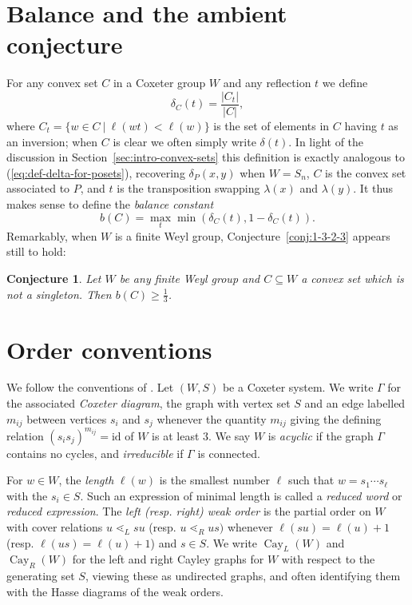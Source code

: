 \documentclass{amsart}
\DeclareMathOperator{\cay}{Cay}
\newcommand{\id}{\mathrm{id}}
\newtheorem{conj}[theorem]{Conjecture}
\theoremstyle{definition}
\theoremstyle{remark}
\begin{document}
\section*{Balance and the ambient conjecture}
For any convex set $C$ in a Coxeter group $W$ and any reflection $t$ we define
\[
\delta_C(t)=\frac{|C_t|}{|C|},
\]
where $C_t=\{w \in C \: | \: \ell(wt)<\ell(w)\}$ is the set of elements in $C$ having $t$ as an inversion; when $C$ is clear we often simply write $\delta(t)$.  In light of the discussion in Section~\ref{sec:intro-convex-sets} this definition is exactly analogous to (\ref{eq:def-delta-for-posets}), recovering $\delta_P(x,y)$ when $W=S_n$, $C$ is the convex set associated to $P$, and $t$ is the transposition swapping $\lambda(x)$ and $\lambda(y)$.  It thus makes sense to define the \emph{balance constant}
\[
b(C)=\max_t \min(\delta_C(t), 1-\delta_C(t)).
\]
Remarkably, when $W$ is a finite Weyl group, Conjecture~\ref{conj:1-3-2-3} appears still to hold:

\begin{conj}\label{conj:1-3-2-3-weyl}
Let $W$ be any finite Weyl group and $C \subseteq W$ a convex set which is not a singleton. Then $b(C) \geq \frac{1}{3}$.
\end{conj}
\section*{Order conventions}
We follow the conventions of \cite{Bjorner-Brenti}. Let $(W,S)$ be a Coxeter system.  We write $\Gamma$ for the associated \emph{Coxeter diagram}, the graph with vertex set $S$ and an edge labelled $m_{ij}$ between vertices $s_i$ and $s_j$ whenever the quantity $m_{ij}$ giving the defining relation $(s_is_j)^{m_{ij}}=\id$ of $W$ is at least $3$.  We say $W$ is \emph{acyclic} if the graph $\Gamma$ contains no cycles, and \emph{irreducible} if $\Gamma$ is connected.

For $w \in W$, the \emph{length} $\ell(w)$ is the smallest number $\ell$ such that $w=s_1 \cdots s_{\ell}$ with the $s_i \in S$.  Such an expression of minimal length is called a \emph{reduced word} or \emph{reduced expression}.  The \emph{left (resp. right) weak order} is the partial order on $W$ with cover relations $u \lessdot_L su$ (resp. $u \lessdot_R us)$ whenever $\ell(su)=\ell(u)+1$ (resp. $\ell(us)=\ell(u)+1$) and $s \in S$.  We write $\cay_L(W)$ and $\cay_R(W)$ for the left and right Cayley graphs for $W$ with respect to the generating set $S$, viewing these as undirected graphs, and often identifying them with the Hasse diagrams of the weak orders.
\end{document}
